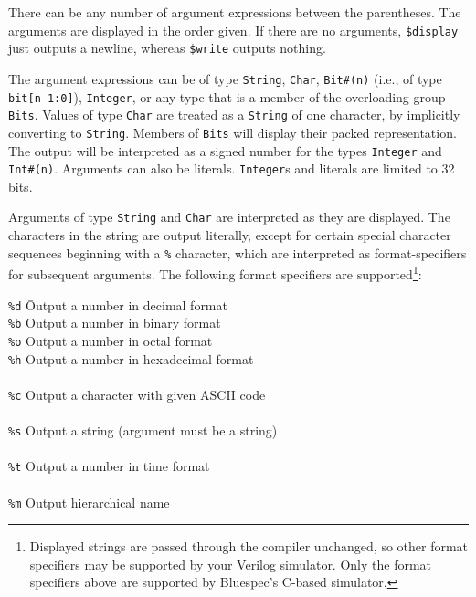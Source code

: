 \documentclass[twoside,letterpaper]{article}
\newcommand{\hmm}{\hspace*{2em}}
\newcommand{\hmmmm}{\hspace*{4em}}
\newcommand{\BS}{Bluespec}
\newcommand{\te}[1]{\texttt{#1}}
\begin{document}
There can be any number of argument expressions between the
parentheses.  The arguments are displayed in the order given.  If
there are no arguments, \texttt{\$display} just outputs a newline,
whereas \texttt{\$write} outputs nothing.

The argument expressions can be of type \texttt{String}, \te{Char},  \texttt{Bit\#(n)}
(i.e., of type \texttt{bit[n-1:0]}), \texttt{Integer}, or any type that is a
member of the overloading group \texttt{Bits}.  Values of type
\te{Char} are treated as a \te{String} of one character, by implicitly
converting to  \te{String}.  Members of \texttt{Bits} will
display their packed representation. The output will be interpreted as
a signed number for the types \texttt{Integer} and \texttt{Int\#(n)}. Arguments 
can also be literals. \texttt{Integer}s and literals are limited to 32 bits.

Arguments of type \texttt{String} and \te{Char} are interpreted as they are displayed.
The characters in the string are output literally, except for certain
special character sequences beginning with a \texttt{\%} character, which
are interpreted as format-specifiers for subsequent arguments.  The
following format specifiers are supported\footnote{Displayed strings are 
passed through the compiler unchanged, so other format specifiers may be
supported by your Verilog simulator. Only the format specifiers above
are supported by {\BS}'s C-based simulator.}:\label{display-args}
\begin{tabbing}
\hmm \= \texttt{\%d} \hmmmm  \= Output a number in decimal format \\
     \> \texttt{\%b}         \> Output a number in binary format \\
     \> \texttt{\%o}         \> Output a number in octal format \\
     \> \texttt{\%h}         \> Output a number in hexadecimal format \\
\\
     \> \texttt{\%c}         \> Output a character with given ASCII code \\
\\
     \> \texttt{\%s}         \> Output a string (argument must be a string) \\
\\
     \> \texttt{\%t}         \> Output a number in time format\\
\\
     \> \texttt{\%m}         \> Output hierarchical name
\end{tabbing}
\end{document}
